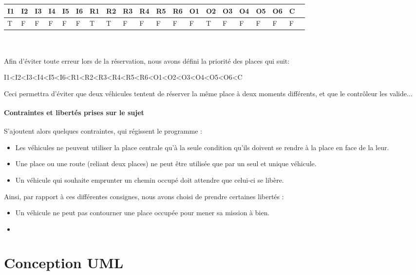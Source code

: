 \documentclass[a4paper, titlepage]{report}
\begin{document}
\begin{tabular}{|l|l|l|l|l|l|l|l|l|l|l|l|l|l|l|l|l|l|l|l|}

\hline
  I1 & I2 & I3 & I4 & I5 & I6 & R1 & R2 & R3 & R4 & R5 & R6 & O1 & O2 & O3 & O4 & O5 & O6 & C \\
  \hline
   T & F & F & F & F & F & T & T & F & F & F & F & F & T & F & F & F & F & F\\
 \hline

\end{tabular}\\
\vspace{0.25cm}\\
Afin d'éviter toute erreur lors de la réservation, nous avons défini la priorité des places qui suit:
\begin{center}
I1<I2<I3<I4<I5<I6<R1<R2<R3<R4<R5<R6<O1<O2<O3<O4<O5<O6<C
\end{center}
Ceci permettra d'éviter que deux véhicules tentent de réserver la même place à deux moments différents, et que le contrôleur les valide...

\subsection{Contraintes et libertés prises sur le sujet}


S'ajoutent alors quelques contraintes, qui régissent le programme :
\begin{itemize}
  \item Les véhicules ne peuvent utiliser la place centrale qu'à la seule condition qu'ils doivent se rendre à la place en face de la leur.
  \item Une place ou une route (reliant deux places) ne peut être utilisée que par un seul et unique véhicule.
  \item Un véhicule qui souhaite emprunter un chemin occupé doit attendre que celui-ci se libère.
\end{itemize}
\vspace{0.25cm}
Ainsi, par rapport à ces différentes consignes, nous avons choisi de prendre certaines libertés :
\vspace{0.25cm}
\begin{itemize}
  \item Un véhicule ne peut pas contourner une place occupée pour mener sa mission à bien.
  \item 
\end{itemize}
\setcounter{chapter}{0}
\setcounter{section}{0}
\part{Conception UML}
\end{document}
